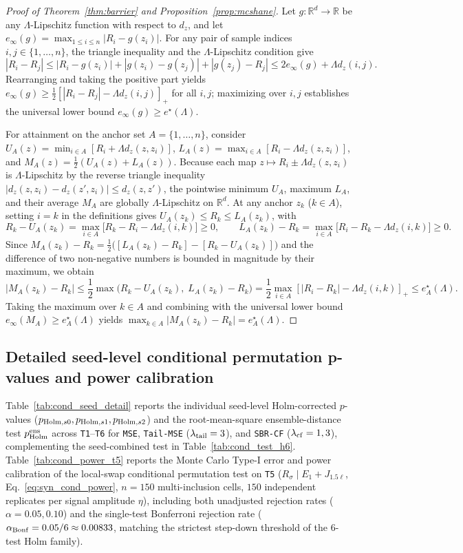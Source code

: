 \documentclass[preprint,11pt,a4paper]{elsarticle}
\newcommand{\R}{\mathbb{R}}
\newcommand{\relu}[1]{\left[#1\right]_{+}}
\begin{document}
\begin{proof}[Proof of Theorem~\ref{thm:barrier} and Proposition~\ref{prop:mcshane}]
Let $g:\R^d\to\R$ be any $\Lambda$-Lipschitz function with respect to $d_z$, and let $e_\infty(g)=\max_{1\le i\le n}|R_i-g(z_i)|$. For any pair of sample indices $i,j\in\{1,\dots,n\}$, the triangle inequality and the $\Lambda$-Lipschitz condition give
\[
|R_i-R_j|
\le |R_i-g(z_i)| + |g(z_i)-g(z_j)| + |g(z_j)-R_j|
\le 2e_\infty(g) + \Lambda d_z(i,j).
\]
Rearranging and taking the positive part yields $e_\infty(g)\ge \frac12\relu{|R_i-R_j|-\Lambda d_z(i,j)}$ for all $i,j$; maximizing over $i,j$ establishes the universal lower bound $e_\infty(g)\ge e^\star(\Lambda)$.

For attainment on the anchor set $A=\{1,\dots,n\}$, consider $U_A(z)=\min_{i\in A}[R_i+\Lambda d_z(z,z_i)]$, $L_A(z)=\max_{i\in A}[R_i-\Lambda d_z(z,z_i)]$, and $M_A(z)=\frac12(U_A(z)+L_A(z))$. Because each map $z\mapsto R_i\pm \Lambda d_z(z,z_i)$ is $\Lambda$-Lipschitz by the reverse triangle inequality $|d_z(z,z_i)-d_z(z',z_i)|\le d_z(z,z')$, the pointwise minimum $U_A$, maximum $L_A$, and their average $M_A$ are globally $\Lambda$-Lipschitz on $\R^d$. At any anchor $z_k$ ($k\in A$), setting $i=k$ in the definitions gives $U_A(z_k)\le R_k\le L_A(z_k)$, with
\[
R_k - U_A(z_k) = \max_{i\in A}\big[R_k - R_i - \Lambda d_z(i,k)\big]\ge 0,
\qquad
L_A(z_k) - R_k = \max_{i\in A}\big[R_i - R_k - \Lambda d_z(i,k)\big]\ge 0.
\]
Since $M_A(z_k)-R_k = \frac12\big([L_A(z_k)-R_k] - [R_k-U_A(z_k)]\big)$ and the difference of two non-negative numbers is bounded in magnitude by their maximum, we obtain
\[
\big|M_A(z_k)-R_k\big|
\le \frac12\max\big(R_k-U_A(z_k),\;L_A(z_k)-R_k\big)
= \frac12\max_{i\in A}\relu{|R_i-R_k|-\Lambda d_z(i,k)}
\le e^\star_A(\Lambda).
\]
Taking the maximum over $k\in A$ and combining with the universal lower bound $e_\infty(M_A)\ge e^\star_A(\Lambda)$ yields $\max_{k\in A}|M_A(z_k)-R_k|=e^\star_A(\Lambda)$.
\end{proof}

\subsection{Detailed seed-level conditional permutation p-values and power calibration}
\label{app:cond_power}

Table~\ref{tab:cond_seed_detail} reports the individual seed-level Holm-corrected $p$-values ($p_{{\rm Holm},s0}, p_{{\rm Holm},s1}, p_{{\rm Holm},s2}$) and the root-mean-square ensemble-distance test $p_{\rm Holm}^{\rm ens}$ across \texttt{T1}--\texttt{T6} for \texttt{MSE}, \texttt{Tail-MSE} ($\lambda_{\rm tail}=3$), and \texttt{SBR-CF} ($\lambda_{\rm cf}=1,3$), complementing the seed-combined test in Table~\ref{tab:cond_test_h6}. Table~\ref{tab:cond_power_t5} reports the Monte Carlo Type-I error and power calibration of the local-swap conditional permutation test on \texttt{T5} ($R_\sigma\mid E_1+J_{1.5\ell}$, Eq.~\eqref{eq:syn_cond_power}, $n=150$ multi-inclusion cells, $150$ independent replicates per signal amplitude $\eta$), including both unadjusted rejection rates ($\alpha=0.05, 0.10$) and the single-test Bonferroni rejection rate ($\alpha_{\rm Bonf}=0.05/6\approx 0.00833$, matching the strictest step-down threshold of the 6-test Holm family).
\end{document}
